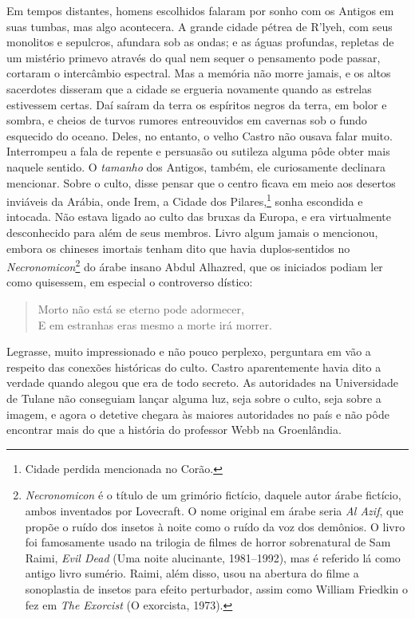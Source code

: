 Em tempos distantes, homens escolhidos falaram por sonho com os Antigos
em suas tumbas, mas algo acontecera. A grande cidade pétrea de R'lyeh,
com seus monolitos e sepulcros, afundara sob as ondas; e as águas
profundas, repletas de um mistério primevo através do qual nem sequer o
pensamento pode passar, cortaram o intercâmbio espectral. Mas a memória
não morre jamais, e os altos sacerdotes disseram que a cidade se
ergueria novamente quando as estrelas estivessem certas. Daí saíram da
terra os espíritos negros da terra, em bolor e sombra, e cheios de
turvos rumores entreouvidos em cavernas sob o fundo esquecido do oceano.
Deles, no entanto, o velho Castro não ousava falar muito. Interrompeu a fala
de repente e persuasão ou sutileza alguma pôde obter mais naquele
sentido. O \emph{tamanho} dos Antigos, também, ele curiosamente
declinara mencionar. Sobre o culto, disse pensar que o centro ficava em
meio aos desertos inviáveis da Arábia, onde Irem, a Cidade dos
Pilares,\footnote{Cidade perdida mencionada no Corão.} sonha escondida e
intocada. Não estava ligado ao culto das bruxas da Europa, e era
virtualmente desconhecido para além de seus membros. Livro algum jamais
o mencionou, embora os chineses imortais tenham dito que havia
duplos-sentidos no \emph{Necronomicon}\footnote{\emph{Necronomicon} é o
  título de um grimório fictício, daquele autor árabe fictício, ambos
  inventados por Lovecraft. O nome original em árabe seria \emph{Al
  Azif}, que propõe o ruído dos insetos à noite como o ruído da
  voz dos demônios. O livro foi famosamente usado na trilogia de
  filmes de horror sobrenatural de Sam Raimi, \emph{Evil Dead}
  (Uma noite alucinante, 1981--1992), mas é referido lá como antigo livro sumério. Raimi, além
  disso, usou na abertura do filme a sonoplastia de insetos para efeito
  perturbador, assim como William Friedkin o fez em \emph{The Exorcist}
  (O exorcista, 1973).} do árabe insano Abdul Alhazred, que os iniciados podiam ler
como quisessem, em especial o controverso dístico:
\begin{quote}\noindent
Morto não está se eterno pode adormecer,\\
E em estranhas eras mesmo a morte irá morrer.
\end{quote}

Legrasse, muito impressionado e não pouco perplexo, perguntara em vão a
respeito das conexões históricas do culto. Castro aparentemente havia
dito a verdade quando alegou que era de todo secreto. As autoridades na
Universidade de Tulane não conseguiam lançar alguma luz, seja sobre o
culto, seja sobre a imagem, e agora o detetive chegara às maiores
autoridades no país e não pôde encontrar mais do que a história do
professor Webb na Groenlândia.

